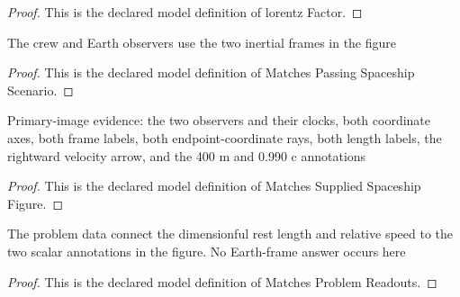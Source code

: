 \begin{proof}
  This is the declared model definition of lorentz Factor.
\end{proof}
\begin{definition}
  \label{def:physics:phyx-mini-0509:phyxminiproblems-problemphyxmini0509-matchespassingspaceshipscenario}
  The crew and Earth observers use the two inertial frames in the figure
\end{definition}
\begin{proof}
  This is the declared model definition of Matches Passing Spaceship Scenario.
\end{proof}
\begin{definition}
  \label{def:physics:phyx-mini-0509:phyxminiproblems-problemphyxmini0509-matchessuppliedspaceshipfigure}
  Primary-image evidence: the two observers and their clocks, both coordinate axes, both frame labels, both endpoint-coordinate rays, both length labels, the rightward velocity arrow, and the 400 m and 0.990 c annotations
\end{definition}
\begin{proof}
  This is the declared model definition of Matches Supplied Spaceship Figure.
\end{proof}
\begin{definition}
  \label{def:physics:phyx-mini-0509:phyxminiproblems-problemphyxmini0509-matchesproblemreadouts}
  The problem data connect the dimensionful rest length and relative speed to the two scalar annotations in the figure. No Earth-frame answer occurs here
\end{definition}
\begin{proof}
  This is the declared model definition of Matches Problem Readouts.
\end{proof}
